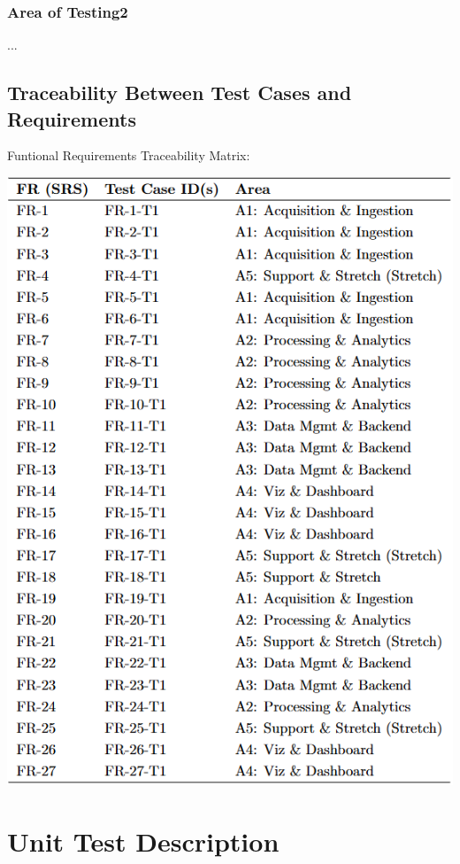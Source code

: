\documentclass[12pt, titlepage]{article}
\begin{document}
\subsubsection{Area of Testing2}

...

\subsection{Traceability Between Test Cases and Requirements}


  Funtional Requirements Traceability Matrix:
\begin{center}
  \includegraphics[width=\textwidth]{Images/FR-Tests-Traceability-Matrix.png}
\end{center}

\section{Unit Test Description}
\end{document}
